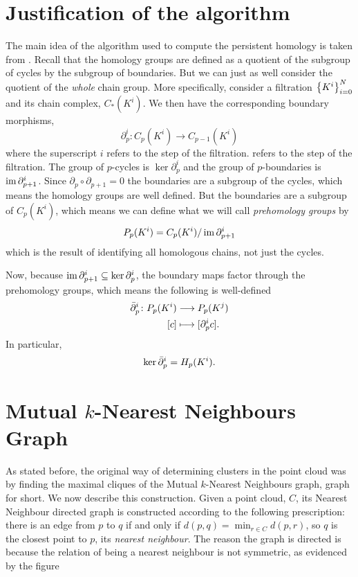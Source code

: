 \documentclass[../main.tex]{subfiles}
\begin{document}
\section{Justification of the algorithm}
The main idea of the algorithm used to compute the persistent homology is taken from
\cite{campos}. Recall that the homology groups are defined as a quotient of the subgroup
of cycles by the subgroup of boundaries. But we can just as well consider the quotient of the \emph{whole} chain group. More
specifically, consider a filtration \( \left\{ K^i \right\}_{i = 0}^N \) and its chain
complex, \( C_\ast(K^i) \). We then have the corresponding boundary morphisms,
\begin{equation*}
	\partial_p^i \colon C_p(K^i) \to C_{p-1}(K^i)
\end{equation*}
where the superscript \( i \) refers to the step of the filtration.  refers to the step of
the filtration. The group of \( p \)-cycles is \( \ker{\partial_p^i} \) and the group of
\( p \)-boundaries is \( \operatorname{im}{\partial_{p+1}^i} \). Since \( \partial_p \circ \partial_{p+1}
= 0 \) the boundaries are a subgroup of the cycles, which means the homology groups are
well defined. But the boundaries are a subgroup of \( C_p(K^i) \), which means we can
define what we will call \emph{prehomology groups} by
\begin{equation*}
	P_p(K^i) = C_p(K^i) / \operatorname{im}{\partial_{p+1}^i}
\end{equation*}
which is the result of identifying all homologous chains, not just the cycles. 

Now, because \( \operatorname{im}{\partial_{p+1}^i} \subseteq \ker{\partial_p^i} \), the boundary maps
factor through the prehomology groups, which means the following is well-defined
\begin{align*}
	\bar{\partial}_{p}^{i} \colon P_p(K^i) & \longrightarrow P_p(K^j) \\
	[c] & \longmapsto [\partial_p^i c]. 
\end{align*}
In particular,
\begin{equation*}
	\ker{\bar{\partial}_{p}^{i}} = H_p(K^i). 
\end{equation*}



\section{Mutual \texorpdfstring{\( k \)}{k}-Nearest Neighbours Graph}
As stated before, the original way of determining clusters in the point cloud was by
finding the maximal cliques of the Mutual \( k \)-Nearest Neighbours graph, \MKNN 
graph for short. We now describe this construction. Given a point cloud, \( C \), its 
Nearest Neighbour directed graph is constructed according to the following
prescription: there is an edge from \( p \) to \( q \) if and only if \( d(p,q) = \min_{r
	\in C} d(p,r) \), so \( q \) is the closest point to \( p \), its \emph{nearest
neighbour}. The reason the graph is directed is because the relation of being a nearest
neighbour is not symmetric, as evidenced by the figure
\end{document}
